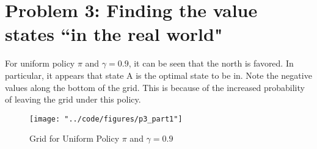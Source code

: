 \documentclass[twoside,11pt]{homework}
\DeclarePairedDelimiter{\2norm}{\lVert}{\rVert^2_2}
\newcommand{\1}[1]{\mathds{1}\left[#1\right]}
\begin{document}
%


\section*{\large Problem 3: Finding the value states ``in the real world"}

For uniform policy $\pi$ and $\gamma = 0.9$, it can be seen that the north is favored. In particular, it appears that state A is the optimal state to be in. Note the negative values along the bottom of the grid. This is because of the increased probability of leaving the grid under this policy. 

\begin{figure}[H]
\centering
\caption{Grid for Uniform Policy $\pi$ and $\gamma = 0.9$}
\texttt{[image: "../code/figures/p3\_part1"]}
\label{fig:uniform-grid}
\end{figure}
\end{document}
